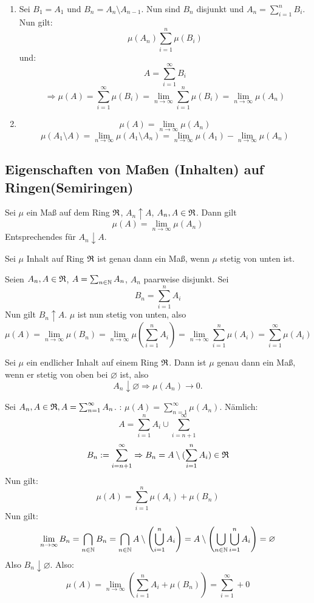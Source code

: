 		\begin{bew}
			\begin{enumerate}
				\item Sei $B_1=A_1$ und $B_n=A_n\setminus A_{n-1}$. Nun sind $B_n$ disjunkt und $A_n=\sum_{i=1}^n B_i$. Nun gilt:
				\[ \mu(A_n)\sum_{i=1}^n \mu(B_i) \]
				und:
				\[ A=\sum_{i=1}^\infty B_i \]
				\[ \Rightarrow \mu(A)=\sum_{i=1}^\infty \mu(B_i)=\lim_{n\to\infty}\sum_{i=1}^n \mu(B_i)=\lim_{n\to\infty} \mu(A_n) \]
				\item 
				\[ \mu(A)=\lim_{n\to\infty}\mu(A_n) \]
				\[ \mu(A_1\setminus A)=\lim_{n\to\infty} \mu(A_1\setminus A_n)=\lim_{n\to\infty} \mu(A_1)-\lim_{n\to\infty} \mu(A_n) \]
			\end{enumerate}
		\end{bew}
			
		\subsection{Eigenschaften von Maßen (Inhalten) auf Ringen(Semiringen)}
			\begin{satz}
				Sei $\mu$ ein Maß auf dem Ring $\mathfrak{R}$, $A_n\uparrow A$, $A_n, A\in \mathfrak{R}$. Dann gilt
				\[ \mu(A)=\lim_{n\to\infty} \mu(A_n) \]
				Entsprechendes für $A_n\downarrow A$.
			\end{satz}
			\begin{satz}
				Sei $\mu$ Inhalt auf Ring $\mathfrak{R}$ ist genau dann ein Maß, wenn $\mu$ stetig von unten ist.
			\end{satz}
			\begin{bew}
				Seien $A_n, A\in\mathfrak{R}$, $A=\sum_{n\in\mathbb{N}} A_n$, $A_n$ paarweise disjunkt. Sei 
				\[ B_n=\sum_{i=1}^n A_i \]
				Nun gilt $B_n\uparrow A$. $\mu$ ist nun stetig von unten, also
				\[ \mu(A)=\lim_{n\to\infty}\mu(B_n)=\lim_{n\to\infty}\mu(\sum_{i=1}^n A_i)=\lim_{n\to\infty} \sum_{i=1}^n \mu(A_i)=\sum_{i=1}^\infty \mu(A_i) \]\arge
			\end{bew}
			\begin{satz}
				Sei $\mu$ ein endlicher Inhalt auf einem Ring $\mathfrak{R}$. Dann ist $\mu$ genau dann ein Maß, wenn er stetig von oben bei $\varnothing$ ist, also
				\[ A_n\downarrow \varnothing\Rightarrow \mu(A_n)\to 0. \]
			\end{satz}
			
			\begin{bew}
				Sei $A_n,A\in\mathfrak{R}, A=\sum_{n=1}^\infty A_n$. \newline
				\zz: $\mu(A)=\sum_{n=1}^\infty \mu(A_n)$. \newline
				Nämlich:
				\[ A=\sum_{i=1}^n A_i\cup \sum_{i=n+1}^\infty \]
				\[ B_n:=\sum_{i=n+1}^\infty \Rightarrow B_n=A\setminus(\sum_{i=1}^n A_i)\in\mathfrak{R} \]
				Nun gilt:
				\[ \mu(A)=\sum_{i=1}^n \mu(A_i)+\mu(B_n) \]
				Nun gilt:
				\[ \lim_{n\to\infty} B_n=\bigcap_{n\in\mathbb{N}} B_n=\bigcap_{n\in\mathbb{N}} A\setminus \left(\bigcup_{i=1}^n A_i\right)=A\setminus\left(\bigcup_{n\in\mathbb{N}}\bigcup_{i=1}^n A_i\right)=\varnothing \]
				Also $B_n\downarrow \varnothing$. Also:
				\[ \mu(A)=\lim_{n\to\infty} \left( \sum_{i=1}^n A_i + \mu(B_n)\right)=\sum_{i=1}^\infty + 0 \]
				\arge
			\end{bew}
			
